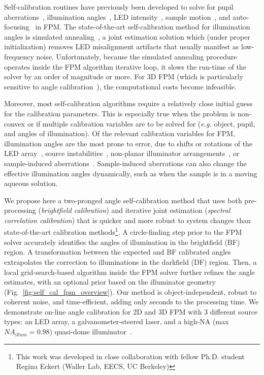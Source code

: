 Self-calibration routines have previously been developed to solve for pupil aberrations~\cite{Thibault2009,Ou:14,Horstmeyer:14}, illumination angles~\cite{Yeh2015,Sun:16LEDpos,Liu:17, maiden2012annealing, zhang2013translation}, LED intensity~\cite{Bian:13}, sample motion~\cite{Bian:16}, and auto-focusing~\cite{Dou2017} in FPM. The state-of-the-art self-calibration method for illumination angles is simulated annealing~\cite{Yeh2015,Sun:16LEDpos}, a joint estimation solution which (under proper initialization) removes LED misalignment artifacts that usually manifest as low-frequency noise. Unfortunately, because the simulated annealing procedure operates inside the FPM algorithm iterative loop, it slows the run-time of the solver by an order of magnitude or more. For 3D FPM (which is particularly sensitive to angle calibration~\cite{tian20153d}), the computational costs become infeasible.

Moreover, most self-calibration algorithms require a relatively close initial guess for the calibration parameters. This is especially true when the problem is non-convex or if multiple calibration variables are to be solved for (\textit{e.g.} object, pupil, and angles of illumination). Of the relevant calibration variables for FPM, illumination angles are the most prone to error, due to shifts or rotations of the LED array~\cite{Guo:15}, source instabilities~\cite{Kuang:15,Eckert:16}, non-planar illuminator arrangements~\cite{Chung2016,phillips2015multi,Sen:16,Phillips:17}, or sample-induced aberrations~\cite{Hell:1993,Kang:18}. Sample-induced aberrations can also change the effective illumination angles dynamically, such as when the sample is in a moving aqueous solution.

We propose here a two-pronged angle self-calibration method that uses both pre-processing (\textit{brightfield calibration}) and iterative joint estimation (\textit{spectral correlation calibration}) that is quicker and more robust to system changes than state-of-the-art calibration methods\footnote{This work was developed in close collaboration with fellow Ph.D. student Regina Eckert (Waller Lab, EECS, UC Berkeley)}. A circle-finding step prior to the FPM solver accurately identifies the angles of illumination in the brightfield (BF) region. A transformation between the expected and BF calibrated angles extrapolates the correction to illuminations in the darkfield (DF) region. Then, a local grid-search-based algorithm inside the FPM solver further refines the angle estimates, with an optional prior based on the illuminator geometry (Fig.~\ref{fig:self_cal_fpm_overview}). Our method is object-independent, robust to coherent noise, and time-efficient, adding only seconds to the processing time. We demonstrate on-line angle calibration for 2D and 3D FPM with 3 different source types: an LED array, a galvanometer-steered laser, and a high-NA (max $NA_{illum} = 0.98$) quasi-dome illuminator~\cite{Phillips:17}.

